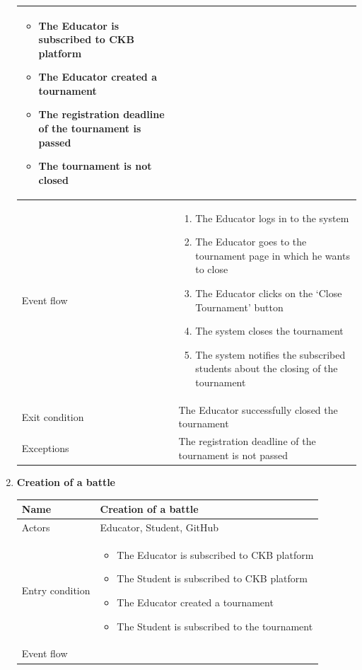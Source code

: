 \begin{enumerate}[label=UC\arabic*:]
\begin{tabular}{|p{3cm}|p{8cm}|}
\begin{itemize}
        \item The Educator is subscribed to CKB platform
        \item The Educator created a tournament
        \item The registration deadline of the tournament is passed
        \item The tournament is not closed
    \end{itemize}
    \\
    \hline
    Event flow &
    \begin{enumerate}[label=\arabic*.]
        \item The Educator logs in to the system
        \item The Educator goes to the tournament page in which he wants to close
        \item The Educator clicks on the `Close Tournament' button
        \item The system closes the tournament
        \item The system notifies the subscribed students about the closing of the tournament
    \end{enumerate}
    \\
    \hline
    Exit condition & The Educator successfully closed the tournament \\
    \hline
    Exceptions & The registration deadline of the tournament is not passed \\
    \hline
    \end{tabular}
    \item \textbf{Creation of a battle} \\
    \begin{tabular}{|p{3cm}|p{8cm}|}
        \hline
        Name & Creation of a battle \\
        \hline
        Actors & Educator, Student, GitHub \\
        \hline
        Entry condition &
        \begin{itemize}
            \item The Educator is subscribed to CKB platform
            \item The Student is subscribed to CKB platform
            \item The Educator created a tournament
            \item The Student is subscribed to the tournament
        \end{itemize}
        \\
        \hline
        Event flow & 

\end{tabular}
\end{enumerate}
